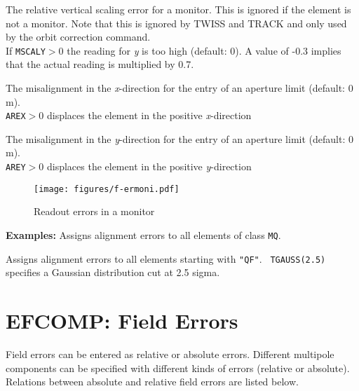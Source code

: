 \begin{madlist}
   The relative vertical scaling error for a monitor. This is
  ignored if the element is not a monitor. Note that this is ignored by TWISS and TRACK
  and only used by the orbit correction command.  \\ 
  If \texttt{MSCALY}$>$0 the reading for \textit{y} is too high (default: 0). A
  value of -0.3 implies that the actual reading is multiplied by 0.7.  

   The misalignment in the \textit{x}-direction for the entry
  of an aperture limit (default: 0 m). \\ 
  \texttt{AREX}$>$0 displaces the element in the positive \textit{x}-direction 

   The misalignment in the \textit{y}-direction for the entry
  of an aperture limit (default: 0 m). \\ 
  \texttt{AREY}$>$0 displaces the element in the positive \textit{y}-direction 

\end{madlist}

\begin{figure}[htb]
	\centering
	\setlength{\unitlength}{1pt}
	\texttt{[image: figures/f-ermoni.pdf]}
	\caption{Readout errors in a monitor}
	\label{F-ERMONI}
\end{figure}

\textbf{Examples:}
Assigns alignment errors to all elements of class \texttt{MQ}.

Assigns alignment errors to all elements starting with \texttt{"QF"}. \texttt{
TGAUSS(2.5)} specifies a Gaussian distribution cut at 2.5 sigma.


%

\section{EFCOMP: Field Errors}
\label{sec:efcomp}
Field errors can be entered as relative or absolute errors. Different
multipole components can be specified with different kinds of errors
(relative or absolute). Relations between absolute and relative field
errors are listed below.  

